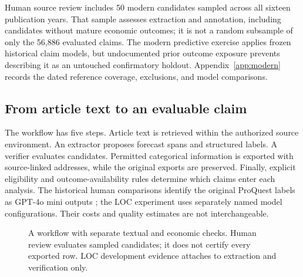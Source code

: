 Human source review includes 50 modern candidates sampled across all sixteen publication years. That sample assesses extraction and annotation, including candidates without mature economic outcomes; it is not a random subsample of only the 56,886 evaluated claims. The modern predictive exercise applies frozen historical claim models, but undocumented prior outcome exposure prevents describing it as an untouched confirmatory holdout. Appendix~\ref{app:modern} records the dated reference coverage, exclusions, and model comparisons.

\subsection{From article text to an evaluable claim}
The workflow has five steps. Article text is retrieved within the authorized source environment. An extractor proposes forecast spans and structured labels. A verifier evaluates candidates. Permitted categorical information is exported with source-linked addresses, while the original exports are preserved. Finally, explicit eligibility and outcome-availability rules determine which claims enter each analysis. The historical human comparisons identify the original ProQuest labels as GPT-4o mini outputs \citep{openai4omini}; the LOC experiment uses separately named model configurations. Their costs and quality estimates are not interchangeable.

\begin{figure}[t]
\centering
\setlength{\fboxsep}{7pt}
\caption{A workflow with separate textual and economic checks. Human review evaluates sampled candidates; it does not certify every exported row. LOC development evidence attaches to extraction and verification only.}
\label{fig:pipeline}
\end{figure}

